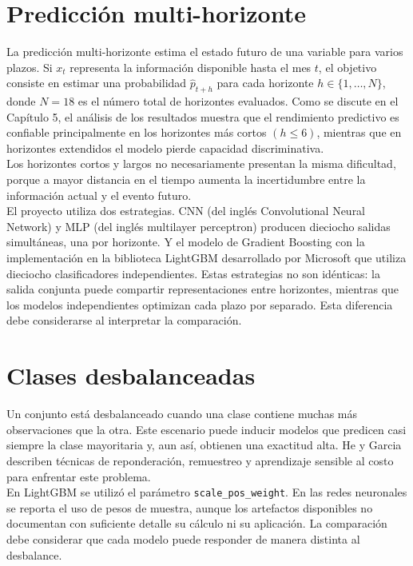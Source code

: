 \section{Predicción multi-horizonte}

La predicción multi-horizonte estima el estado futuro de una variable para varios plazos. Si $x_t$ representa la información disponible hasta el mes $t$, el objetivo consiste en estimar una probabilidad $\hat{p}_{t+h}$ para cada horizonte $h \in \{1, \ldots, N\}$, donde $ N = 18$ es el número total de horizontes evaluados. Como se discute en el Capítulo 5, el análisis de los resultados muestra que el rendimiento predictivo es confiable principalmente en los horizontes más cortos $(h \le 6 )$, mientras que en horizontes extendidos el modelo pierde capacidad discriminativa.\\

Los horizontes cortos y largos no necesariamente presentan la misma dificultad, porque a mayor distancia en el tiempo aumenta la incertidumbre entre la información actual y el evento futuro.\\

El proyecto utiliza dos estrategias. CNN (del inglés Convolutional Neural Network) y MLP (del inglés multilayer perceptron) producen dieciocho salidas simultáneas, una por horizonte. Y el modelo de Gradient Boosting con la implementación en la biblioteca LightGBM desarrollado por Microsoft que utiliza dieciocho clasificadores independientes. Estas estrategias no son idénticas: la salida conjunta puede compartir representaciones entre horizontes, mientras que los modelos independientes optimizan cada plazo por separado. Esta diferencia debe considerarse al interpretar la comparación.

\section{Clases desbalanceadas}

Un conjunto está desbalanceado cuando una clase contiene muchas más observaciones que la otra. Este escenario puede inducir modelos que predicen casi siempre la clase mayoritaria y, aun así, obtienen una exactitud alta. He y Garcia \cite{he2009learning} describen técnicas de reponderación, remuestreo y aprendizaje sensible al costo para enfrentar este problema.\\

En LightGBM se utilizó el parámetro \texttt{scale\_pos\_weight}. En las redes neuronales se reporta el uso de pesos de muestra, aunque los artefactos disponibles no documentan con suficiente detalle su cálculo ni su aplicación. La comparación debe considerar que cada modelo puede responder de manera distinta al desbalance.


